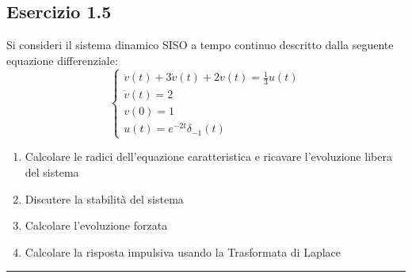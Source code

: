 \documentclass[12pt,a4paper]{article}
\begin{document}
	\subsection*{Esercizio 1.5} Si consideri il sistema dinamico SISO a tempo continuo descritto dalla seguente equazione differenziale:
	\[
		\begin{cases}
			\ddot{v}(t) + 3\dot{v}(t) + 2v(t) = \frac{1}{3}u(t)\\
			\dot{v}(t) = 2\\
			v(0) = 1\\
			u(t) = e^{-2t}\delta_{-1}(t)
		\end{cases}
	\]
	\begin{enumerate}
		\item Calcolare le radici dell'equazione caratteristica e ricavare l'evoluzione libera del sistema
		\item Discutere la stabilità del sistema
		\item Calcolare l'evoluzione forzata
		\item Calcolare la risposta impulsiva usando la Trasformata di Laplace
	\end{enumerate}
	\par\noindent\rule{\textwidth}{0.4pt}
\end{document}
